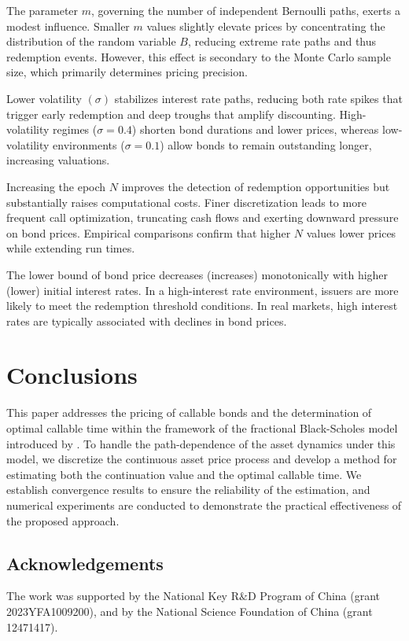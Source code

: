 \documentclass[reqno]{amsart}
\begin{document}
The parameter $m$, governing the number of independent Bernoulli paths, exerts a
modest influence. Smaller $m$ values slightly elevate prices by concentrating the 
distribution of the random variable $B$, reducing extreme rate paths and thus 
redemption events. However, this effect is secondary to the Monte Carlo sample size, 
which primarily determines pricing precision.

Lower volatility $(\sigma)$ stabilizes interest rate paths, reducing both rate spikes 
that trigger early redemption and deep troughs that amplify discounting. High-volatility 
regimes ($\sigma = 0.4$) shorten bond durations and lower prices, whereas low-volatility 
environments ($\sigma = 0.1$) allow bonds to remain outstanding longer, increasing 
valuations.

Increasing the epoch $N$ improves the detection of redemption opportunities but 
substantially raises computational costs. Finer discretization leads to more frequent 
call optimization, truncating cash flows and exerting downward pressure on bond prices. 
Empirical comparisons confirm that higher $N$ values lower prices while extending 
run times.


The lower bound of bond price decreases (increases) monotonically with higher (lower) 
initial interest rates.
In a high-interest rate environment, issuers are more likely to meet the redemption 
threshold conditions. In real markets, high interest rates are typically associated 
with declines in bond prices.

\section{Conclusions}
\label{sec:conclusions}

This paper addresses the pricing of callable bonds and the determination of optimal 
callable time within the framework of the fractional Black-Scholes model introduced 
by \cite{becker2019deep}.
To handle the path-dependence of the asset dynamics under this model, we discretize 
the continuous asset price process and develop a method for estimating both the 
continuation value and the optimal callable time. We establish convergence results 
to ensure the reliability of the estimation, and numerical experiments are conducted 
to demonstrate the practical effectiveness of the proposed approach.

\subsection*{Acknowledgements}
The work was supported by the National Key R$\&$D Program of China (grant 
2023YFA1009200), and by the National Science Foundation of China (grant 12471417).
\end{document}
